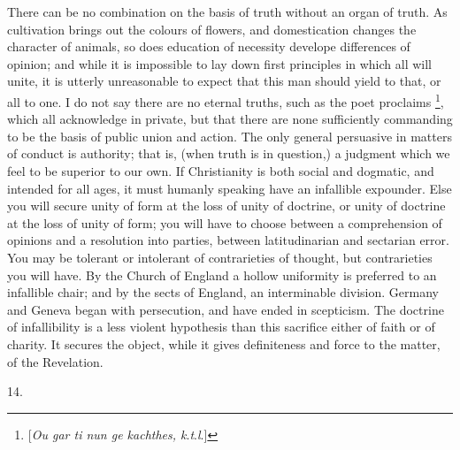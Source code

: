 There can be no combination on the basis of truth
without an organ of truth. As cultivation brings out the
colours of flowers, and domestication changes the
character of animals, so does education of necessity
develope differences of opinion; and while it is
impossible to lay down first principles in which all will
unite, it is utterly unreasonable to expect that this man
should yield to that, or all to one. I do not say there
are no eternal truths, such as the poet proclaims \footnote{[\emph{Ou gar ti nun ge kachthes, k}.\emph{t}.\emph{l}.]},
which all acknowledge in private, but that there are none
sufficiently commanding to be the basis of public union
and action. The only general persuasive in matters of
conduct is authority; that is, (when truth is in
question,) a judgment which we feel to be superior to our
own. If Christianity is both social and dogmatic, and
intended for all ages, it must humanly speaking have an
infallible expounder. Else you will secure unity of form
at the loss of unity of doctrine, or unity of doctrine at
the loss of unity of form; you will have to choose
between a comprehension of opinions and a resolution into
parties, between latitudinarian and sectarian error. You
may be tolerant or intolerant of contrarieties of
thought, but contrarieties you will have. By the Church
of England a hollow uniformity is preferred to an
infallible chair; and by the sects of England, an
interminable division. Germany and Geneva began with
persecution, and have ended in scepticism. The doctrine
of infallibility is a less violent hypothesis than this
sacrifice either of faith or of charity. It secures the
object, while it gives definiteness and force to the
matter, of the Revelation.

14.

